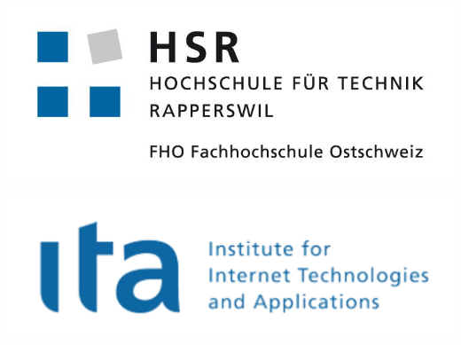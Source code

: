 

\begin{titlepage}

\begin{center}
\begin{minipage}[t]{0.45\textwidth}
    \includegraphics[width=\textwidth]{start/img/hsrLogo}
\end{minipage}
\hspace{\fill} %
\begin{minipage}[t]{0.45\textwidth}
    \vspace{-2.56cm}
    \includegraphics[width=\textwidth]{start/img/itaLogo} %
\end{minipage}

\end{center}

\vspace{15ex} %
\begin{center}
	\Huge 
	\begin{framed}
		\textbf{\titel}
	\end{framed}
	
	\vspace{3ex}
	\textbf{\work}
	
	\vspace{1ex}
	\LARGE 
	\place
	

\end{center}
\end{titlepage}
